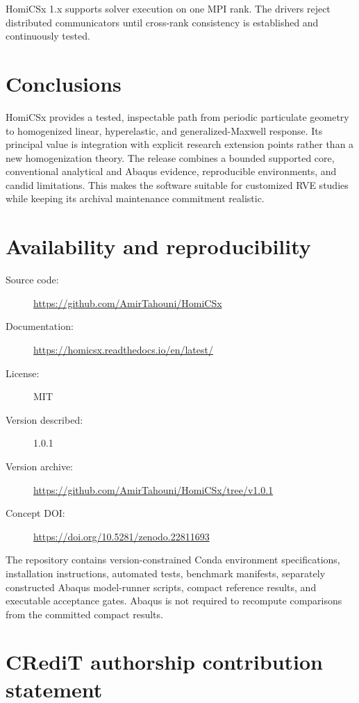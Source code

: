\documentclass[preprint,12pt]{elsarticle}
\begin{document}
HomiCSx 1.x supports solver execution on one MPI rank. The drivers reject
distributed communicators until cross-rank consistency is established and
continuously tested.

\section{Conclusions}

HomiCSx provides a tested, inspectable path from periodic particulate geometry
to homogenized linear, hyperelastic, and generalized-Maxwell response. Its
principal value is integration with explicit research extension points rather
than a new homogenization theory. The release combines a bounded supported
core, conventional analytical and Abaqus evidence, reproducible environments,
and candid limitations. This makes the software suitable for customized RVE
studies while keeping its archival maintenance commitment realistic.

\section{Availability and reproducibility}

\begin{description}
  \item[Source code:] \url{https://github.com/AmirTahouni/HomiCSx}
  \item[Documentation:] \url{https://homicsx.readthedocs.io/en/latest/}
  \item[License:] MIT
  \item[Version described:] 1.0.1
  \item[Version archive:] \url{https://github.com/AmirTahouni/HomiCSx/tree/v1.0.1}
  \item[Concept DOI:] \url{https://doi.org/10.5281/zenodo.22811693}
\end{description}

The repository contains version-constrained Conda environment specifications, installation
instructions, automated tests, benchmark manifests, separately constructed
Abaqus model-runner scripts, compact reference results, and executable
acceptance gates. Abaqus is
not required to recompute comparisons from the committed compact results.

\section*{CRediT authorship contribution statement}
\end{document}
